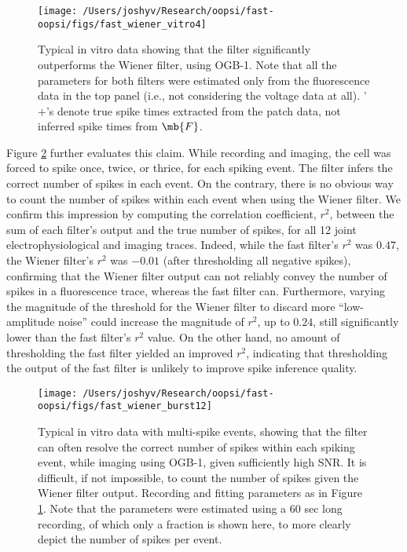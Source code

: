 \begin{figure}[h!]
\centering \texttt{[image: /Users/joshyv/Research/oopsi/fast-oopsi/figs/fast\_wiener\_vitro4]}
\caption[\foopsi filter outperforms Wiener filter on biological data]{Typical in vitro data showing that the \foopsi filter significantly outperforms the Wiener filter, using OGB-1. Note that all the parameters for both filters were estimated only from the fluorescence data in the top panel (i.e., not considering the voltage data at all).  '$+$'s denote true spike times extracted from the patch data, not inferred spike times from $\mb{F}$.} \label{fig:woopsi_data}
\end{figure}


Figure \ref{fig:woopsi_data_doublets} further evaluates this claim.  While recording and imaging, the cell was forced to spike once, twice, or thrice, for each spiking event.  The \foopsi filter infers the correct number of spikes in each event.  On the contrary, there is no obvious way to count the number of spikes within each event when using the Wiener filter. We confirm this impression by computing the correlation coefficient, $r^2$, between the sum of each filter's output and the true number of spikes, for all 12 joint electrophysiological and imaging traces.  Indeed, while the fast filter's $r^2$ was $0.47$, the Wiener filter's $r^2$ was $-0.01$ (after thresholding all negative spikes), confirming that the Wiener filter output can not reliably convey the number of spikes in a fluorescence trace, whereas the fast filter can.  Furthermore, varying the magnitude of the threshold for the Wiener filter to discard more ``low-amplitude noise'' could increase the magnitude of $r^2$, up to $0.24$, still significantly lower than the fast filter's $r^2$ value.  On the other hand, no amount of thresholding the fast filter yielded an improved $r^2$, indicating that thresholding the output of the fast filter is unlikely to improve spike inference quality.

\begin{figure}[h!]
\centering \texttt{[image: /Users/joshyv/Research/oopsi/fast-oopsi/figs/fast\_wiener\_burst12]}
\caption[\foopsi filter outperforms Wiener filter on multi-spike events]{Typical in vitro data with multi-spike events, showing that the \foopsi filter can often resolve the correct number of spikes within each spiking event, while imaging using OGB-1, given sufficiently high SNR.  It is difficult, if not impossible, to count the number of spikes given the Wiener filter output.  Recording and fitting parameters as in Figure \ref{fig:woopsi_data}. Note that the parameters were estimated using a 60 sec long recording, of which only a fraction is shown here, to more clearly depict the number of spikes per event.  } \label{fig:woopsi_data_doublets}
\end{figure}




